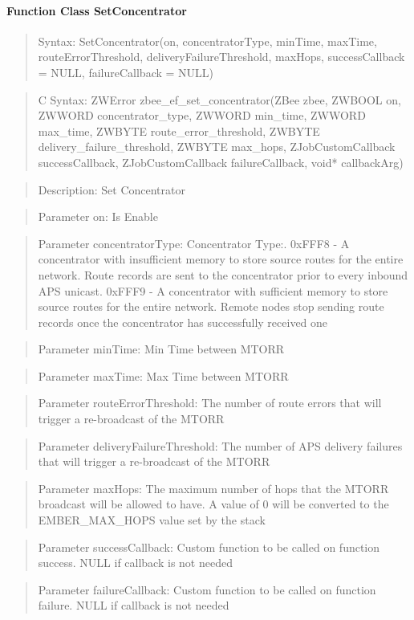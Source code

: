 \paragraph{Function Class SetConcentrator}
\begin{quote}Syntax: SetConcentrator(on, concentratorType, minTime, maxTime, routeErrorThreshold, deliveryFailureThreshold, maxHops, successCallback = NULL, failureCallback = NULL)\end{quote}
\begin{quote}C Syntax: ZWError zbee\_ef\_set\_concentrator(ZBee zbee, ZWBOOL on, ZWWORD concentrator\_type, ZWWORD min\_time, ZWWORD max\_time, ZWBYTE route\_error\_threshold, ZWBYTE delivery\_failure\_threshold, ZWBYTE max\_hops, ZJobCustomCallback successCallback, ZJobCustomCallback failureCallback, void* callbackArg)\end{quote}
\begin{quote}Description: Set Concentrator\end{quote}
\begin{quote}Parameter on: Is Enable\end{quote}
\begin{quote}Parameter concentratorType: Concentrator Type:. 0xFFF8 - A concentrator with insufficient memory to store source routes for the entire network. Route records are sent to the concentrator prior to every inbound APS unicast. 0xFFF9 - A concentrator with sufficient memory to store source routes for the entire network. Remote nodes stop sending route records once the concentrator has successfully received one\end{quote}
\begin{quote}Parameter minTime: Min Time between MTORR\end{quote}
\begin{quote}Parameter maxTime: Max Time between MTORR\end{quote}
\begin{quote}Parameter routeErrorThreshold: The number of route errors that will trigger a re-broadcast of the MTORR\end{quote}
\begin{quote}Parameter deliveryFailureThreshold: The number of APS delivery failures that will trigger a re-broadcast of the MTORR\end{quote}
\begin{quote}Parameter maxHops: The maximum number of hops that the MTORR broadcast will be allowed to have. A value of 0 will be converted to the EMBER\_MAX\_HOPS value set by the stack\end{quote}
\begin{quote}Parameter successCallback: Custom function to be called on function success. NULL if callback is not needed\end{quote}
\begin{quote}Parameter failureCallback: Custom function to be called on function failure. NULL if callback is not needed\end{quote}

